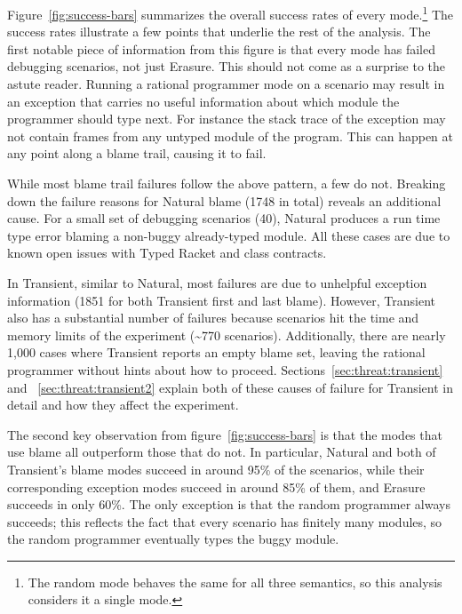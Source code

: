 Figure~\ref{fig:success-bars} summarizes the overall success rates of
every mode.\footnote{The random mode behaves the same for
all three semantics, so this analysis considers it a single mode.}
The success rates illustrate a few points that underlie the
rest of the analysis.  The first notable piece of information from this
figure is that every mode has failed debugging scenarios, not just
Erasure. This should not come as a surprise to the astute reader.  Running
a rational programmer mode on a scenario may result in an exception
that carries no useful information about which module the programmer
should type next. For instance the stack trace of the exception may not
contain frames from any untyped module of the program. This can happen at any point
along a blame trail, causing it to fail.

While most blame trail failures follow the above pattern, a few do
not.  Breaking down the failure reasons for Natural blame (1748 in
total) reveals an additional cause. For a small set of debugging scenarios
(40), Natural produces a run time type error blaming a non-buggy
already-typed module. All these cases are due to known open issues with Typed
Racket and class contracts. 

In Transient, similar to Natural, most failures are due to unhelpful
exception information (1851 for both Transient first and last blame).
However, Transient also has a substantial number of failures because
scenarios hit the time and memory limits of the experiment
(\textasciitilde770 scenarios).  Additionally, there are nearly 1,000
cases where Transient reports an empty blame set, leaving the rational
programmer without hints about how to proceed.
Sections~\ref{sec:threat:transient} and ~\ref{sec:threat:transient2}
explain both of these causes of failure for Transient in detail and how
they affect the
experiment. 

The second key observation from figure~\ref{fig:success-bars} is that the
modes that use blame all outperform those that do not.  In particular,
Natural and both of Transient's blame modes succeed in around 95\% of the
scenarios, while their corresponding exception modes succeed in around
85\% of them, and Erasure succeeds in only 60\%.  The only
exception is that the random programmer always succeeds; this reflects the
fact that every scenario has finitely many modules, so the random programmer 
eventually types the buggy module.



